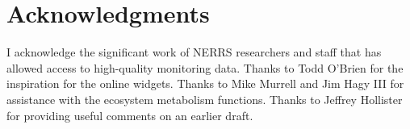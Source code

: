 \section{Acknowledgments}

I acknowledge the significant work of NERRS researchers and staff that has allowed access to high-quality monitoring data.  Thanks to Todd O'Brien for the inspiration for the online widgets. Thanks to Mike Murrell and Jim Hagy III for assistance with the ecosystem metabolism functions. Thanks to Jeffrey Hollister for providing useful comments on an earlier draft.



\address{Marcus W Beck\\
  ORISE Research Participation Program\\
  USEPA National Health and Environmental Effects Research Laboratory, Gulf Ecology Division\\
  1 Sabine Island Drive, Gulf Breeze, FL 32651\\
  USA\\}

